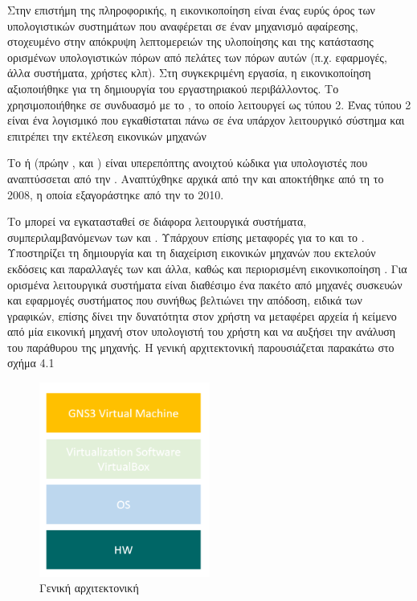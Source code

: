 Στην επιστήμη της πληροφορικής, η εικονικοποίηση  είναι ένας ευρύς όρος 
των υπολογιστικών συστημάτων που αναφέρεται σε έναν μηχανισμό αφαίρεσης, 
στοχευμένο στην απόκρυψη λεπτομερειών της υλοποίησης και της κατάστασης
ορισμένων υπολογιστικών πόρων από πελάτες των πόρων αυτών 
(π.χ. εφαρμογές, άλλα συστήματα, χρήστες κλπ). 
Στη συγκεκριμένη εργασία, η εικονικοποίηση αξιοποιήθηκε για τη δημιουργία του εργαστηριακού περιβάλλοντος. Το  χρησιμοποιήθηκε σε συνδυασμό με το , το οποίο λειτουργεί ως  τύπου 2. Ένας  τύπου 2 είναι ένα λογισμικό που εγκαθίσταται πάνω σε ένα υπάρχον λειτουργικό σύστημα και επιτρέπει την εκτέλεση εικονικών μηχανών

Το  ή  (πρώην ,  και ) είναι υπερεπόπτης
ανοιχτού κώδικα για υπολογιστές  που αναπτύσσεται από την .
Αναπτύχθηκε αρχικά από την 
και αποκτήθηκε από τη  το 2008, η οποία εξαγοράστηκε από την  το 2010.

Το  μπορεί να εγκατασταθεί σε διάφορα λειτουργικά συστήματα, συμπεριλαμβανόμενων των  και .
Υπάρχουν επίσης μεταφορές για το  και το .
Υποστηρίζει τη δημιουργία και τη διαχείριση εικονικών μηχανών που εκτελούν εκδόσεις και παραλλαγές των 
και άλλα, καθώς και περιορισμένη εικονικοποίηση .
Για ορισμένα λειτουργικά συστήματα είναι διαθέσιμο ένα πακέτο  από μηχανές συσκευών και εφαρμογές συστήματος
που συνήθως βελτιώνει την απόδοση, ειδικά των γραφικών, επίσης δίνει την δυνατότητα στον χρήστη να μεταφέρει αρχεία ή κείμενο από μία εικονική μηχανή στον υπολογιστή του χρήστη και να αυξήσει την ανάλυση του παράθυρου της μηχανής. 
Η γενική αρχιτεκτονική παρουσιάζεται παρακάτω στο σχήμα 4.1

\begin{figure}[htb]
	\centering
	\includegraphics[width=0.5\textwidth]{graphics/Architecture_virtualbox.PNG}
	\caption{ Γενική αρχιτεκτονική}
\end{figure}

